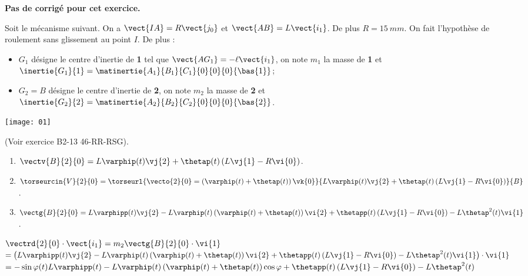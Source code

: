 \normalfalse \difficiletrue \tdifficilefalse
\correctionfalse


\setcounter{numques}{0}
\ifcorrection
\else
\textbf{Pas de corrigé pour cet exercice.}
\fi

\ifprof
\else
Soit le mécanisme suivant. On a $\vect{IA}=R\vect{j_0}$ et $\vect{AB}=L\vect{i_1}$. De plus $R=\SI{15}{mm}$.
On fait l'hypothèse de roulement sans glissement au point $I$. De plus :
\begin{itemize}
\item $G_1$ désigne le centre d'inertie de \textbf{1} tel que $\vect{AG_1}=-\ell\vect{i_1}$, on note $m_1$ la masse de \textbf{1} et $\inertie{G_1}{1}=\matinertie{A_1}{B_1}{C_1}{0}{0}{0}{\bas{1}}$; 
\item $G_2=B$ désigne le centre d'inertie de \textbf{2}, on note $m_2$ la masse de \textbf{2} et $\inertie{G_2}{2}=\matinertie{A_2}{B_2}{C_2}{0}{0}{0}{\bas{2}}$.
\end{itemize}
\begin{center}
\texttt{[image: 01]}
\end{center}
\fi

\ifprof
(Voir exercice B2-13 46-RR-RSG).
\begin{enumerate}
\item $\vectv{B}{2}{0} = L\varphip(t)\vj{2} +\thetap(t)\left(L\vj{1}-R\vi{0}\right) $.
\item  $\torseurcin{V}{2}{0} = \torseurl{\vecto{2}{0}=\left( \varphip(t)+\thetap(t) \right) \vk{0} }{ L\varphip(t)\vj{2} +\thetap(t)\left(L\vj{1}-R\vi{0}\right)}{B}$.
\item $\vectg{B}{2}{0} =  L\varphipp(t)\vj{2}-L\varphip(t)\left(\varphip(t)+\thetap(t) \right)\vi{2}  + \thetapp(t)\left(L\vj{1}-R\vi{0}\right) - L\thetap^2(t)\vi{1}$.
\end{enumerate} 

$\vectrd{2}{0}\cdot \vect{i_1} = m_2 \vectg{B}{2}{0} \cdot \vi{1}$
$ =\left( L\varphipp(t)\vj{2}-L\varphip(t)\left(\varphip(t)+\thetap(t) \right)\vi{2}  + \thetapp(t)\left(L\vj{1}-R\vi{0}\right) - L\thetap^2(t)\vi{1} \right) \cdot \vi{1}$
$ = -\sin\varphi(t) L\varphipp(t)-L\varphip(t)\left(\varphip(t)+\thetap(t) \right)\cos\varphi  + \thetapp(t)\left(L\vj{1}-R\vi{0}\right) - L\thetap^2(t)$


